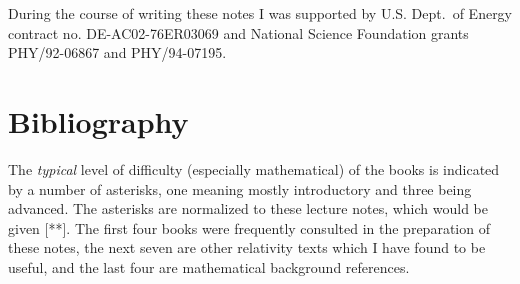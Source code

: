 \documentclass[12pt]{article}
\begin{document}
During the course of writing these notes I was supported by
U.S. Dept.~of Energy contract no. DE-AC02-76ER03069 and National
Science Foundation grants PHY/92-06867 and PHY/94-07195.

\eject

\section*{Bibliography}

\noindent
The {\it typical} level of difficulty (especially mathematical) of the books
is indicated by a number of asterisks, one meaning mostly introductory
and three being advanced.  The asterisks are
normalized to these lecture notes, which would be given [**].  The 
first four books were frequently consulted in the preparation of these
notes, the next seven are other relativity texts which I have found
to be useful, and the last four are mathematical background references.
\end{document}
